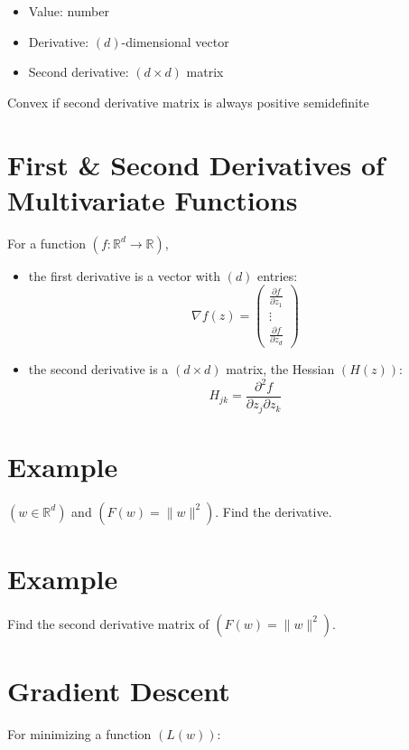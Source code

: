 \documentclass{article}
\begin{document}
\begin{itemize}
    \item Value: number
    \item Derivative: $( d )$-dimensional vector
    \item Second derivative: $( d \times d )$ matrix
\end{itemize}

Convex if second derivative matrix is always positive semidefinite

\section*{First \& Second Derivatives of Multivariate Functions}
For a function $( f: \mathbb{R}^{d} \rightarrow \mathbb{R} )$,

\begin{itemize}
    \item the first derivative is a vector with $( d )$ entries:
    \begin{equation}
    \nabla f(z) = \left(\begin{array}{c}
    \frac{\partial f}{\partial z_{1}} \\
    \vdots \\
    \frac{\partial f}{\partial z_{d}}
    \end{array}\right)
    \end{equation}

    \item the second derivative is a $( d \times d )$ matrix, the Hessian $( H(z) )$:
    \begin{equation}
    H_{j k} = \frac{\partial^{2} f}{\partial z_{j} \partial z_{k}}
    \end{equation}
\end{itemize}

\section*{Example}
$( w \in \mathbb{R}^{d} )$ and $( F(w) = \|w\|^{2} )$. Find the derivative.

\section*{Example}
Find the second derivative matrix of $( F(w) = \|w\|^{2} )$.

\section*{Gradient Descent}
For minimizing a function $( L(w) )$:
\end{document}
